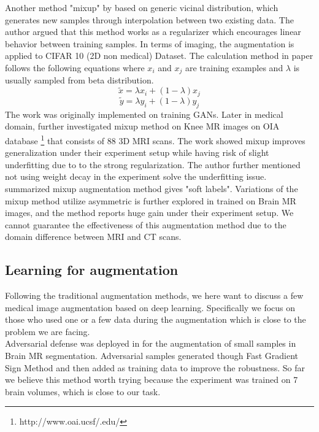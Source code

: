 Another method "mixup" by \cite{zhang_mixup_2018} based on generic vicinal distribution, which generates new samples through interpolation between two existing data. The author argued that this method works as a regularizer which encourages linear behavior between training samples. In terms of imaging, the augmentation is applied to CIFAR 10 (2D non medical) Dataset. The calculation method in paper follows the following equations where $x_{i}$ and $x_{j}$ are training examples and $\lambda$ is usually sampled from beta distribution.
$$\tilde{x}=\lambda x_{i}+(1-\lambda) x_{j}$$
$$\tilde{y}=\lambda y_{i}+(1-\lambda) y_{j}$$
The work was originally implemented on training GANs. Later in medical domain, \cite{panfilov_improving_2019} further investigated mixup method on Knee MR images on OIA database \footnote{http://www.oai.ucsf/.edu/} that consists of 88 3D MRI scans. The work showed mixup improves generalization under their experiment setup while having risk of slight underfitting due to to the strong regularization. The author further mentioned not using weight decay in the experiment solve the underfitting issue.
\cite{tajbakhsh_embracing_2020} summarized mixup augmentation method gives "soft labels". Variations of the mixup method utilize asymmetric is further explored in \cite{li_overfitting_2019} trained on Brain MR images, and the method reports huge gain under their experiment setup.
We cannot guarantee the effectiveness of this augmentation method due to the domain difference between MRI and CT scans.

\subsection{Learning for augmentation}
Following the traditional augmentation methods, we here want to discuss a few medical image augmentation based on deep learning. Specifically we focus on those who used one or a few data during the augmentation which is close to the problem we are facing.\\

Adversarial defense was deployed in \cite{suk_brain_2019} for the augmentation of small samples in Brain MR segmentation. Adversarial samples generated though Fast Gradient Sign Method\cite{goodfellow_explaining_2015} and then added as training data to improve the robustness. So far we believe this method worth trying because the experiment was trained on 7 brain volumes, which is close to our task.\\


